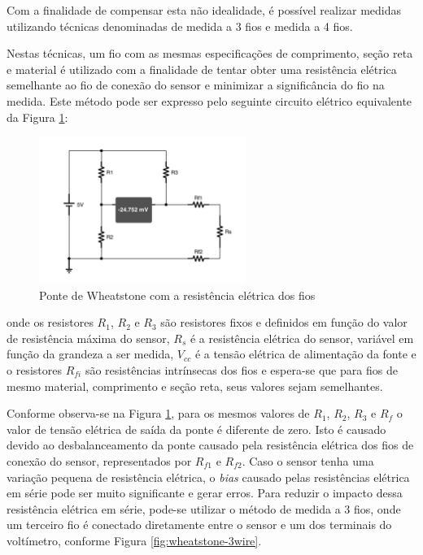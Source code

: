 \documentclass[a4paper]{instrumentacao}
\begin{document}
Com a finalidade de compensar esta não idealidade, é possível realizar medidas utilizando técnicas denominadas de medida a 3 fios e medida a 4 fios.

Nestas técnicas, um fio com as mesmas especificações de comprimento, seção reta e material é utilizado com a finalidade de tentar obter uma resistência elétrica semelhante ao fio de conexão do sensor e minimizar a significância do fio na medida. Este método pode ser expresso pelo seguinte circuito elétrico equivalente da Figura \ref{fig:wheatstone-wire-model}:

\begin{figure}[H]
\centering
\includegraphics[width=0.6\textwidth]{Wheatstone-Bridge-WiresModel.pdf}
\caption{Ponte de Wheatstone com a resistência elétrica dos fios}
\label{fig:wheatstone-wire-model}
\end{figure}

\noindent onde os resistores $R_1$, $R_2$ e $R_3$ são resistores fixos e definidos em função do valor de resistência máxima do sensor, $R_s$ é a resistência elétrica do sensor, variável em função da grandeza a ser medida, $V_{cc}$ é a tensão elétrica de alimentação da fonte e o resistores $R_{fi}$ são resistências intrínsecas dos fios e espera-se que para fios de mesmo material, comprimento e seção reta, seus valores sejam semelhantes.

Conforme observa-se na Figura \ref{fig:wheatstone-wire-model}, para os mesmos valores de $R_1$, $R_2$, $R_3$ e $R_f$ o valor de tensão elétrica de saída da ponte é diferente de zero. Isto é causado devido ao desbalanceamento da ponte causado pela resistência elétrica dos fios de conexão do sensor, representados por $R_{f1}$ e $R_{f2}$. Caso o sensor tenha uma variação pequena de resistência elétrica, o \textit{bias} causado pelas resistências elétrica em série pode ser muito significante e gerar erros. Para reduzir o impacto dessa resistência elétrica em série, pode-se utilizar o método de medida a 3 fios, onde um terceiro fio é conectado diretamente entre o sensor e um dos terminais do voltímetro, conforme Figura \ref{fig:wheatstone-3wire}.
\end{document}
